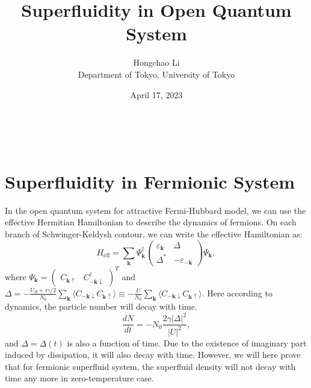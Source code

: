 \documentclass{article}
\newcommand{\tmaffiliation}[1]{\\ #1}
\newcommand{\tmmathbf}[1]{\ensuremath{\boldsymbol{#1}}}
\newcommand{\tmop}[1]{\ensuremath{\operatorname{#1}}}
\newcommand{\tmstrong}[1]{\textbf{#1}}
\begin{document}
\title{Superfluidity in Open Quantum System}

\author{
  {\tmstrong{}}Hongchao Li
  \tmaffiliation{Department of Tokyo, University of Tokyo}
}

\date{April 17, 2023}

\maketitle

{\tableofcontents}

\

\section{Superfluidity in Fermionic System}

In the open quantum system for attractive Fermi-Hubbard model, we can use the
effective Hermitian Hamiltonian to describe the dynamics of fermions. On each
branch of Schwinger-Keldysh contour, we can write the effective Hamiltonian
as:
\begin{equation}
  H_{\tmop{eff}} = \sum_{\tmmathbf{k}} \Psi_{\tmmathbf{k}}^{\dagger}
  \left(\begin{array}{cc}
    \varepsilon_{\tmmathbf{k}} & \Delta\\
    \Delta^{\ast} & - \varepsilon_{-\tmmathbf{k}}
  \end{array}\right) \Psi_{\tmmathbf{k}},
\end{equation}
where $\Psi_{\tmmathbf{k}} = \left(\begin{array}{cc}
  C_{\tmmathbf{k} \uparrow} & C^{\dagger}_{-\tmmathbf{k} \downarrow}
\end{array}\right)^T$ and $\Delta = - \frac{U_R + i \gamma / 2}{N_0}
\sum_{\tmmathbf{k}} \langle C_{-\tmmathbf{k} \downarrow} C_{\tmmathbf{k}
\uparrow} \rangle \equiv - \frac{U}{N_0} \sum_{\tmmathbf{k}} \langle
C_{-\tmmathbf{k} \downarrow} C_{\tmmathbf{k} \uparrow} \rangle$.
Here according to dynamics, the particle number will decay with time.
\begin{equation}
  \frac{d N}{d t} = - N_0 \frac{2 \gamma | \Delta |^2}{| U |^2},
\end{equation}
and $\Delta = \Delta (t)$ is also a function of time. Due to the existence
of imaginary part induced by dissipation, it will also decay with time.
However, we will here prove that for fermionic superfluid system, the
superfluid density will not decay with time any more in zero-temperature case.
\end{document}
